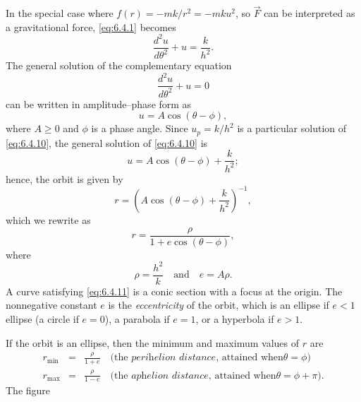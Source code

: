 \documentclass{ximera}
\begin{document}
In the special case where
 $f(r)=-mk/r^2=-mku^2$, so $\vec{F}$  can be interpreted
as a gravitational force, \eqref{eq:6.4.1}  becomes
\begin{equation} \label{eq:6.4.10}
 \frac{d^2u}{d\theta^2}+u=\frac{k}{h^2}.
\end{equation}
The general solution of the complementary equation
$$
 \frac{d^2u}{d\theta^2}+u=0
$$
can be written in amplitude--phase form as
$$
u=A\cos(\theta-\phi),
$$
where $A\ge0$ and $\phi$ is a phase angle.
Since $u_p=k/h^2$ is a particular solution of \eqref{eq:6.4.10},
the general solution of \eqref{eq:6.4.10} is
$$
u=A\cos(\theta-\phi)+\frac{k}{h^2};
$$
hence, the orbit is given by
$$
r=\left(A\cos(\theta-\phi)+\frac{k}{h^2}\right)^{-1},
$$
which we rewrite as
\begin{equation} \label{eq:6.4.11}
r=\frac{\rho}{1+e\cos(\theta-\phi)},
\end{equation}
where
$$
\rho=\frac{h^2}{k}\quad\mbox{and}\quad e=A\rho.
$$
A curve satisfying \eqref{eq:6.4.11} is a conic section with a focus at
the origin. %
The nonnegative constant $e$ is
 the \textit{eccentricity} of the orbit, which is
an ellipse if
$e<1$
ellipse (a circle if $e=0$), a parabola if $e=1$, or a hyperbola if $e>1$.




If  the orbit is an ellipse, then the minimum and maximum
values of $r$  are
\begin{eqnarray*}
r_{\min}&=&\frac{\rho}{1+e}\quad\text{(the }\textit{perihelion
distance}\text{, attained when
$\theta=\phi$)}  \\
 r_{\max}&=&\frac{\rho}{1-e}\quad\text{(the }
\textit{aphelion distance}\text{, attained when
$\theta=\phi+\pi$)}.
\end{eqnarray*}
The figure

\begin{center}
\end{center}
\end{document}
